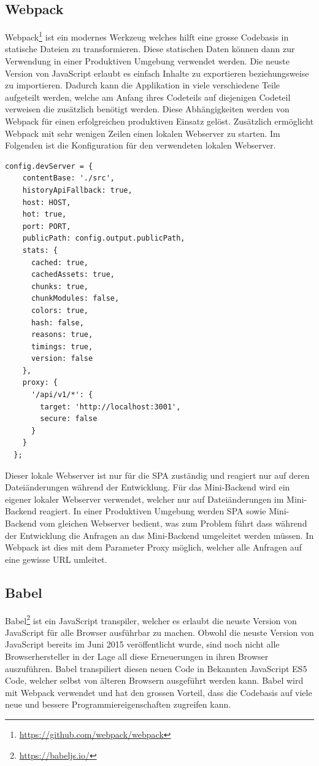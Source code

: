 \subsection{Webpack}
Webpack\footnote{\url{https://github.com/webpack/webpack}} ist ein modernes Werkzeug welches hilft eine grosse Codebasis in statische Dateien zu transformieren. Diese statischen Daten können dann zur Verwendung in einer Produktiven Umgebung verwendet werden. Die neuste Version von JavaScript erlaubt es einfach Inhalte zu exportieren beziehungsweise zu importieren. Dadurch kann die Applikation in viele verschiedene Teile aufgeteilt werden, welche am Anfang ihres Codeteils auf diejenigen Codeteil verweisen die zusätzlich benötigt werden. Diese Abhängigkeiten werden von Webpack für einen erfolgreichen produktiven Einsatz gelöst. Zusätzlich ermöglicht Webpack mit sehr wenigen Zeilen einen lokalen Webserver zu starten. Im Folgenden ist die Konfiguration für den verwendeten lokalen Webserver.
\begin{lstlisting}[caption=Lokaler Webserver]
  config.devServer = {
    contentBase: './src',
    historyApiFallback: true,
    host: HOST,
    hot: true,
    port: PORT,
    publicPath: config.output.publicPath,
    stats: {
      cached: true,
      cachedAssets: true,
      chunks: true,
      chunkModules: false,
      colors: true,
      hash: false,
      reasons: true,
      timings: true,
      version: false
    },
    proxy: {
      '/api/v1/*': {
        target: 'http://localhost:3001',
        secure: false
      }
    }
  };
\end{lstlisting}
Dieser lokale Webserver ist nur für die SPA zuständig und reagiert nur auf deren Dateiänderungen während der Entwicklung. Für das Mini-Backend wird ein eigener lokaler Webserver verwendet, welcher nur auf Dateiänderungen im Mini-Backend reagiert. In einer Produktiven Umgebung werden SPA sowie Mini-Backend vom gleichen Webserver bedient, was zum Problem führt dass während der Entwicklung die Anfragen an das Mini-Backend umgeleitet werden müssen. In Webpack ist dies mit dem Parameter Proxy möglich, welcher alle Anfragen auf eine gewisse URL umleitet.


\subsection{Babel}
Babel\footnote{\url{https://babeljs.io/}} ist ein JavaScript transpiler, welcher es erlaubt die neuste Version von JavaScript für alle Browser ausführbar zu machen. Obwohl die neuste Version von JavaScript bereits im Juni 2015 veröffentlicht wurde, sind noch nicht alle Browserhersteller in der Lage all diese Erneuerungen in ihren Browser auszuführen. Babel transpiliert diesen neuen Code in Bekannten JavaScript ES5 Code, welcher selbst von älteren Browsern ausgeführt werden kann. Babel wird mit Webpack verwendet und hat den grossen Vorteil, dass die Codebasis auf viele neue und bessere Programmiereigenschaften zugreifen kann.

